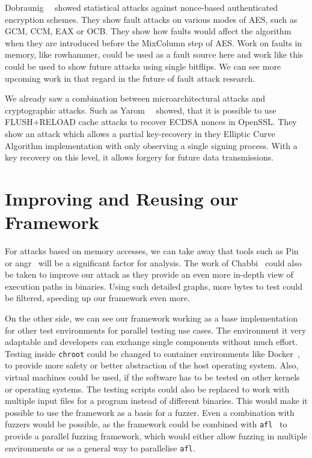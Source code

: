 Dobraunig~\etal~\cite{noncestat} showed statistical attacks against nonce-based
authenticated encryption schemes. They show fault attacks on various modes of
AES, such as GCM, CCM, EAX or OCB. They show how faults would affect the
algorithm when they are introduced before the MixColumn step of AES. Work on
faults in memory, like rowhammer, could be used as a fault source here and work
like this could be used to show future attacks using single bitflips. We can see
more upcoming work in that regard in the future of fault attack research.

We already saw a combination between microarchitectural attacks and
cryptographic attacks. Such as Yarom~\etal~\cite{noncerec} showed, that it is
possible to use FLUSH+RELOAD cache attacks to recover ECDSA nonces in OpenSSL.
They show an attack which allows a partial key-recovery in they Elliptic Curve
Algorithm implementation with only observing a single signing process. With a
key recovery on this level, it allows forgery for future data transmissions.

\section{Improving and Reusing our Framework}

For attacks based on memory accesses, we can take away that tools such as
Pin~\cite{pintool} or angr~\cite{angrpaper} will be a significant factor for
analysis. The work of Chabbi~\etal\cite{pincallpaths} could also be taken to
improve our attack as they provide an even more in-depth view of execution paths
in binaries. Using such detailed graphs, more bytes to test could be filtered,
speeding up our framework even more.

On the other side, we can see our framework working as a base implementation for
other test environments for parallel testing use cases. The environment it very
adaptable and developers can exchange single components without much effort.
Testing inside \texttt{chroot} could be changed to container environments like
Docker~\cite{docker}, to provide more safety or better abstraction of the host
operating system. Also, virtual machines could be used, if the software has to
be tested on other kernels or operating systems. The testing scripts could also
be replaced to work with multiple input files for a program instead of different
binaries. This would make it possible to use the framework as a basis for a
fuzzer. Even a combination with fuzzers would be possible, as the framework
could be combined with \texttt{afl}~\cite{aflweb} to provide a parallel fuzzing
framework, which would either allow fuzzing in multiple environments or as a
general way to parallelise \texttt{afl}.

